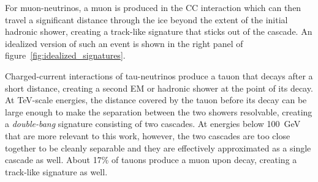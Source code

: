 For muon-neutrinos, a muon is produced in the CC interaction which can then travel a significant distance through the ice beyond the extent of the initial hadronic shower, creating a track-like signature that sticks out of the cascade.
An idealized version of such an event is shown in the right panel of figure~\ref{fig:idealized_signatures}.

Charged-current interactions of tau-neutrinos produce a tauon that decays after a short distance, creating a second EM or hadronic shower at the point of its decay.
At TeV-scale energies, the distance covered by the tauon before its decay can be large enough to make the separation between the two showers resolvable, creating a \emph{double-bang} signature consisting of two cascades.
At energies below 100~GeV that are more relevant to this work, however, the two cascades are too close together to be cleanly separable and they are effectively approximated as a single cascade as well.
About 17\% of tauons produce a muon upon decay, creating a track-like signature as well\cite{pdg}.

